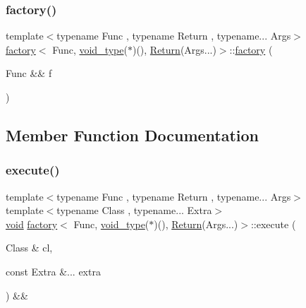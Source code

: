 \subsubsection{\texorpdfstring{factory()}{factory()}}
{\footnotesize\ttfamily template$<$typename Func , typename Return , typename... Args$>$ \\
\mbox{\hyperlink{structfactory}{factory}}$<$ Func, \mbox{\hyperlink{structvoid__type}{void\+\_\+type}}($\ast$)(), \mbox{\hyperlink{_python-ast_8h_abdae7f49d66ce8e500825bb53aa14901}{Return}}(Args...)$>$\+::\mbox{\hyperlink{structfactory}{factory}} (\begin{DoxyParamCaption}\item[{Func \&\&}]{f }\end{DoxyParamCaption})\hspace{0.3cm}{\ttfamily [inline]}}



\subsection{Member Function Documentation}
\mbox{\label{structfactory_3_01_func_00_01void__type_07_5_08_07_08_00_01_return_07_args_8_8_8_08_4_a044edcce660aca30e7fa2aff4c1ce4ba}} 
\subsubsection{\texorpdfstring{execute()}{execute()}}
{\footnotesize\ttfamily template$<$typename Func , typename Return , typename... Args$>$ \\
template$<$typename Class , typename... Extra$>$ \\
\mbox{\hyperlink{_s_d_l__opengles2__gl2ext_8h_ae5d8fa23ad07c48bb609509eae494c95}{void}} \mbox{\hyperlink{structfactory}{factory}}$<$ Func, \mbox{\hyperlink{structvoid__type}{void\+\_\+type}}($\ast$)(), \mbox{\hyperlink{_python-ast_8h_abdae7f49d66ce8e500825bb53aa14901}{Return}}(Args...)$>$\+::execute (\begin{DoxyParamCaption}\item[{Class \&}]{cl,  }\item[{const Extra \&...}]{extra }\end{DoxyParamCaption}) \&\&\hspace{0.3cm}{\ttfamily [inline]}}




